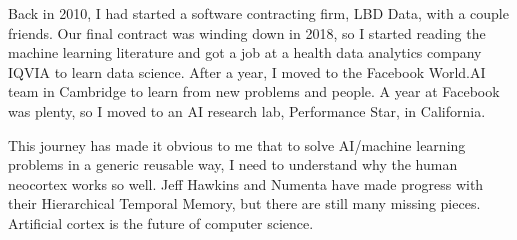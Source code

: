 \documentclass{article}
\begin{document}
Back in 2010, I had started a software contracting firm, LBD Data,
with a couple friends. Our final contract was winding down in 2018, so
I started reading the machine learning literature and got a job at a health data analytics company IQVIA to learn data science.  
After a year, I moved to the Facebook World.AI team in Cambridge to learn from new problems and people. 
A year at Facebook was plenty, so I moved to an AI research lab, Performance Star, in California. 

This journey has made it obvious to me that to solve AI/machine learning problems in a generic reusable way, I need to understand why the human neocortex works so well. 
Jeff Hawkins and Numenta have made progress with their Hierarchical Temporal Memory, but there are still many missing pieces.  Artificial cortex is the
future of computer science.
\end{document}
